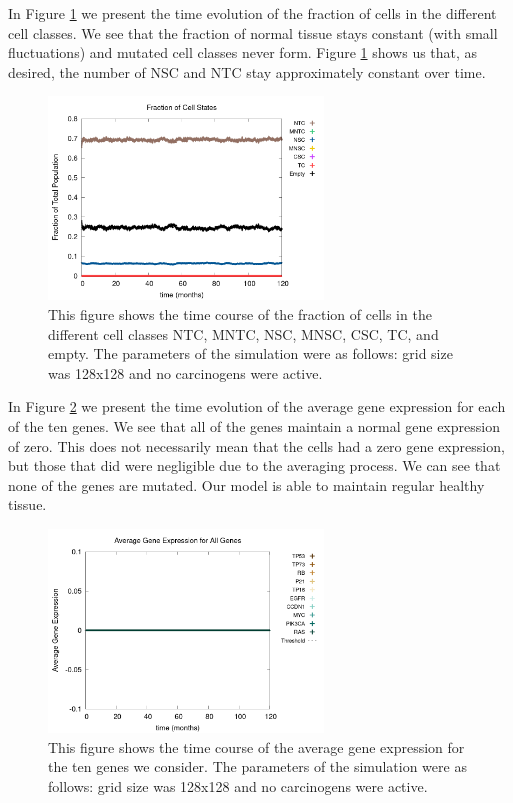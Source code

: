 \documentclass[\main/thesis.tex]{subfiles}
\begin{document}
In Figure \ref{fig:EquilibriumNumState} we present the time evolution of the fraction of cells in the different cell classes. We see that the fraction of normal tissue stays constant (with small fluctuations) and mutated cell classes never form. Figure \ref{fig:EquilibriumNumState} shows us that, as desired, the number of NSC and NTC stay approximately constant over time. 
\begin{figure}[H]
    \centering
    \includegraphics[width=0.65\textwidth]{images/1_Equilibrium/Fig1/numState_all.png}
    \caption{This figure shows the time course of the fraction of cells in the different cell classes NTC, MNTC, NSC, MNSC, CSC, TC, and empty. The parameters of the simulation were as follows: grid size was 128x128 and no carcinogens were active.}
    \label{fig:EquilibriumNumState}
\end{figure}

In Figure \ref{fig:EquilibriumGeneExprAll} we present the time evolution of the average gene expression for each of the ten genes. We see that all of the genes maintain a normal gene expression of zero. This does not necessarily mean that the cells had a zero gene expression, but those that did were negligible due to the averaging process. We can see that none of the genes are mutated. Our model is able to maintain regular healthy tissue. 
\begin{figure}[H]
    \centering
    \includegraphics[width=0.65\textwidth]{images/1_Equilibrium/Fig3/geneExprAll_all.png}
    \caption{This figure shows the time course of the average gene expression for the ten genes we consider. The parameters of the simulation were as follows: grid size was 128x128 and no carcinogens were active.}
    \label{fig:EquilibriumGeneExprAll}
\end{figure}
\end{document}

